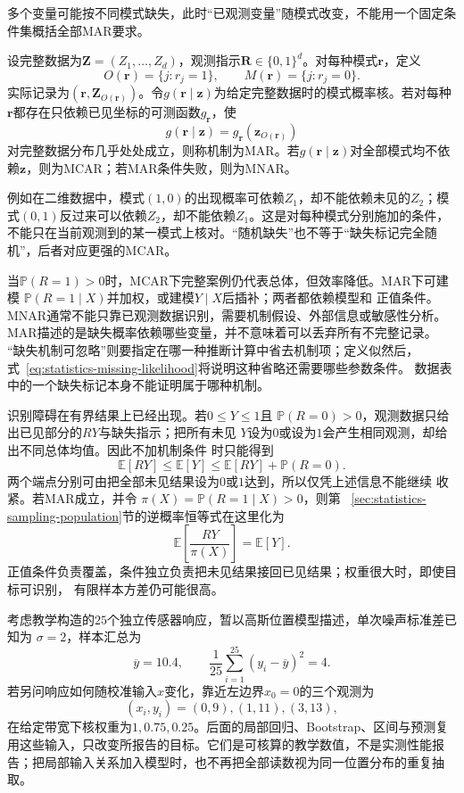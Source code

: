 多个变量可能按不同模式缺失，此时“已观测变量”随模式改变，不能用一个固定条件集概括全部MAR要求。
\begin{definition}[观测模式与缺失机制]
  \label{def:statistics-missingness}
  设完整数据为\(\bm Z=(Z_1,\ldots,Z_d)\)，观测指示\(\bm R\in\{0,1\}^d\)。对每种模式\(\bm r\)，定义
  \[
    O(\bm r)=\{j:r_j=1\},\qquad M(\bm r)=\{j:r_j=0\}.
  \]
  实际记录为\((\bm r,\bm Z_{O(\bm r)})\)。令\(g(\bm r\mid\bm z)\)为给定完整数据时的模式概率核。若对每种\(\bm r\)都存在只依赖已见坐标的可测函数\(g_{\bm r}\)，使
  \[
    g(\bm r\mid\bm z)=g_{\bm r}(\bm z_{O(\bm r)})
  \]
  对完整数据分布几乎处处成立，则称机制为MAR。若\(g(\bm r\mid\bm z)\)对全部模式均不依赖\(\bm z\)，则为MCAR；若MAR条件失败，则为MNAR。
\end{definition}
例如在二维数据中，模式\((1,0)\)的出现概率可依赖\(Z_1\)，却不能依赖未见的\(Z_2\)；模式\((0,1)\)反过来可以依赖\(Z_2\)，却不能依赖\(Z_1\)。这是对每种模式分别施加的条件，不能只在当前观测到的某一模式上核对。“随机缺失”也不等于“缺失标记完全随机”，后者对应更强的MCAR。

当\(\mathbb{P}(R=1)>0\)时，MCAR下完整案例仍代表总体，但效率降低。MAR下可建模
\(\mathbb{P}(R=1\mid X)\)并加权，或建模\(Y\mid X\)后插补；两者都依赖模型和
正值条件。MNAR通常不能只靠已观测数据识别，需要机制假设、外部信息或敏感性分析。
MAR描述的是缺失概率依赖哪些变量，并不意味着可以丢弃所有不完整记录。
“缺失机制可忽略”则要指定在哪一种推断计算中省去机制项；定义似然后，
式~\eqref{eq:statistics-missing-likelihood}将说明这种省略还需要哪些参数条件。
数据表中的一个缺失标记本身不能证明属于哪种机制。

识别障碍在有界结果上已经出现。若\(0\leq Y\leq1\)且
\(\mathbb{P}(R=0)>0\)，观测数据只给出已见部分的\(RY\)与缺失指示；把所有未见
\(Y\)设为\(0\)或设为\(1\)会产生相同观测，却给出不同总体均值。因此不加机制条件
时只能得到
\[
  \mathbb{E}[RY]
  \leq\mathbb{E}[Y]
  \leq\mathbb{E}[RY]+\mathbb{P}(R=0).
\]
两个端点分别可由把全部未见结果设为\(0\)或\(1\)达到，所以仅凭上述信息不能继续
收紧。若MAR成立，并令
\(\pi(X)=\mathbb{P}(R=1\mid X)>0\)，则第
~\ref{sec:statistics-sampling-population}节的逆概率恒等式在这里化为
\[
  \mathbb{E}\left[\frac{RY}{\pi(X)}\right]
  =\mathbb{E}[Y].
\]
正值条件负责覆盖，条件独立负责把未见结果接回已见结果；权重很大时，即使目标可识别，
有限样本方差仍可能很高。
\begin{example}[贯穿本章的传感器校准数据]
\label{ex:statistics-running-sensor-calibration}
考虑教学构造的\(25\)个独立传感器响应，暂以高斯位置模型描述，单次噪声标准差已知为
\(\sigma=2\)，样本汇总为
\[
\overline y=10.4,\qquad
\frac1{25}\sum_{i=1}^{25}(y_i-\overline y)^2=4.
\]
若另问响应如何随校准输入\(x\)变化，靠近左边界\(x_0=0\)的三个观测为
\[
(x_i,y_i)=(0,9),(1,11),(3,13),
\]
在给定带宽下核权重为\(1,0.75,0.25\)。后面的局部回归、Bootstrap、区间与预测复用这些输入，只改变所报告的目标。它们是可核算的教学数值，不是实测性能报告；把局部输入关系加入模型时，也不再把全部读数视为同一位置分布的重复抽取。
\end{example}

